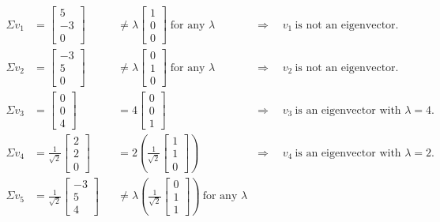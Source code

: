 \documentclass{article}
\begin{document}
{\begin{align*}
\Sigma v_1 &= \begin{bmatrix}5\\-3\\0\end{bmatrix}&
&\neq \lambda \begin{bmatrix}1\\0\\0\end{bmatrix}\;\text{for any }\lambda
&\quad \Longrightarrow\quad v_1\ \text{is not an eigenvector}.\\[6pt]
\Sigma v_2 &= \begin{bmatrix}-3\\5\\0\end{bmatrix}&
&\neq \lambda \begin{bmatrix}0\\1\\0\end{bmatrix}\;\text{for any }\lambda
&\quad\Longrightarrow\quad v_2\ \text{is not an eigenvector}.\\[6pt]
\Sigma v_3 &= \begin{bmatrix}0\\0\\4\end{bmatrix}&
&= 4\begin{bmatrix}0\\0\\1\end{bmatrix}
&\quad\Longrightarrow\quad v_3\ \text{is an eigenvector with }\lambda=4.\\[6pt]
\Sigma v_4 &= \frac{1}{\sqrt{2}}\begin{bmatrix}2\\2\\0\end{bmatrix}&
&= 2\left(\frac{1}{\sqrt{2}}\begin{bmatrix}1\\1\\0\end{bmatrix}\right)
&\quad\Longrightarrow\quad v_4\ \text{is an eigenvector with }\lambda=2.\\[6pt]
\Sigma v_5 &= \frac{1}{\sqrt{2}}\begin{bmatrix}-3\\5\\4\end{bmatrix}&
&\neq \lambda \left(\frac{1}{\sqrt{2}}\begin{bmatrix}0\\1\\1\end{bmatrix}\right)\ \text{for any }\lambda

\end{align*}}
\end{document}
